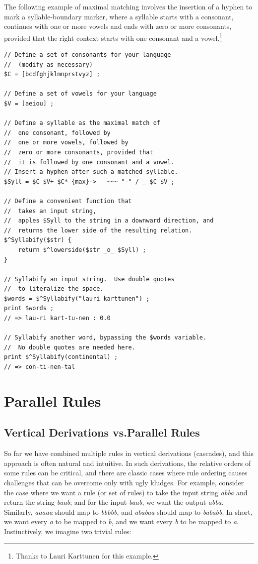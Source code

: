 The following example of maximal matching involves the insertion of a hyphen to mark a syllable-boundary
marker, where a syllable starts with a
consonant, continues with one or more vowels and ends with zero or more consonants,
provided that the right context starts with one consonant and a vowel.\footnote{Thanks to
Lauri Karttunen for this example.}

\begin{Verbatim}
// Define a set of consonants for your language
// 	(modify as necessary)
$C = [bcdfghjklmnprstvyz] ;

// Define a set of vowels for your language
$V = [aeiou] ;

// Define a syllable as the maximal match of
//	one consonant, followed by
//	one or more vowels, followed by
//	zero or more consonants, provided that
//	it is followed by one consonant and a vowel.
// Insert a hyphen after such a matched syllable.
$Syll = $C $V+ $C* {max}->   ~~~ "-" / _ $C $V ;

// Define a convenient function that 
//	takes an input string,
//	apples $Syll to the string in a downward direction, and
//	returns the lower side of the resulting relation.
$^Syllabify($str) { 
	return $^lowerside($str _o_ $Syll) ; 
}

// Syllabify an input string.  Use double quotes
//	to literalize the space.
$words = $^Syllabify("lauri karttunen") ;
print $words ;	
// => lau-ri kart-tu-nen : 0.0

// Syllabify another word, bypassing the $words variable.
//	No double quotes are needed here.
print $^Syllabify(continental) ;
// => con-ti-nen-tal
\end{Verbatim}

\section{Parallel Rules}

\subsection{Vertical Derivations vs.\@ Parallel Rules}

So far we have combined multiple rules in vertical derivations (cascades), and this
approach is often natural and intuitive.  In such derivations, the relative orders of some
rules can be critical, and there are classic cases where rule ordering causes challenges
that can be overcome only with ugly kludges.  For example, consider the case where we want
a rule (or set of rules) to take the input string \emph{abba} and return the string
\emph{baab}; and for the input \emph{baab}, we want the output \emph{abba}.  Similarly,
\emph{aaaaa} should map to \emph{bbbbb}, and \emph{ababaa} should map to \emph{bababb}.  In
short, we want every \emph{a} to be mapped to \emph{b}, and we want every \emph{b} to be
mapped to \emph{a}.  Instinctively, we imagine two trivial rules:


